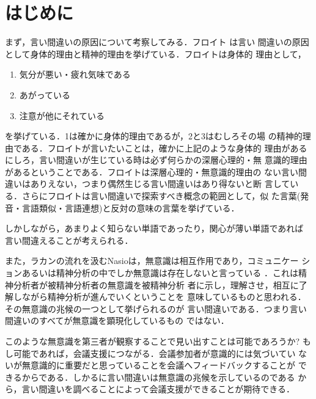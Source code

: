 

\maketitle

\section{はじめに}

まず，言い間違いの原因について考察してみる．フロイト\cite{freud1917a}
は言い
間違いの原因として身体的理由と精神的理由を挙げている．フロイトは身体的
理由として，

\begin{enumerate}
\item 気分が悪い・疲れ気味である
\item あがっている
\item 注意が他にそれている
\end{enumerate}

\noindent を挙げている．1は確かに身体的理由であるが，2と3はむしろその場
の精神的理由である．フロイトが言いたいことは，確かに上記のような身体的
理由があるにしろ，言い間違いが生じている時は必ず何らかの深層心理的・無
意識的理由があるということである．フロイトは深層心理的・無意識的理由の
ない言い間違いはありえない，つまり偶然生じる言い間違いはあり得ないと断
言している．さらにフロイトは言い間違いで探索すべき概念の範囲として，似
た言葉(発音・言語類似・言語連想)と反対の意味の言葉を挙げている．

しかしながら，あまりよく知らない単語であったり，関心が薄い単語であれば
言い間違えることが考えられる．

また，ラカンの流れを汲むNasioは，無意識は相互作用であり，コミュニケー
ションあるいは精神分析の中でしか無意識は存在しないと言っている
\cite{nasio1995a}．これは精神分析者が被精神分析者の無意識を被精神分析
者に示し，理解させ，相互に了解しながら精神分析が進んでいくということを
意味しているものと思われる．その無意識の兆候の一つとして挙げられるのが
言い間違いである．つまり言い間違いのすべてが無意識を顕現化しているもの
ではない．

このような無意識を第三者が観察することで見い出すことは可能であろうか? 
もし可能であれば，会議支援につながる．会議参加者が意識的には気づいてい
ないが無意識的に重要だと思っていることを会議へフィードバックすることが
できるからである．しかるに言い間違いは無意識の兆候を示しているのである
から，言い間違いを調べることによって会議支援ができることが期待できる．

